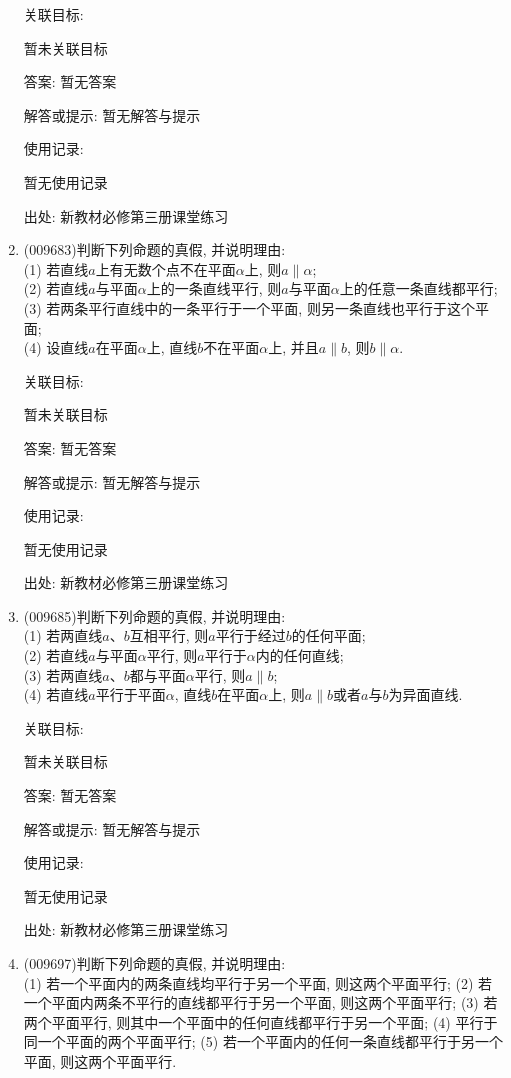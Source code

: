 \documentclass[10pt,a4paper]{article}
\begin{document}
\begin{enumerate}[1.]
关联目标:

暂未关联目标

答案: 暂无答案

解答或提示: 暂无解答与提示

使用记录:

暂无使用记录


出处: 新教材必修第三册课堂练习
\item { (009683)}判断下列命题的真假, 并说明理由:\\
(1) 若直线$a$上有无数个点不在平面$\alpha$上, 则$a\parallel \alpha$;\\
(2) 若直线$a$与平面$\alpha$上的一条直线平行, 则$a$与平面$\alpha$上的任意一条直线都平行;\\
(3) 若两条平行直线中的一条平行于一个平面, 则另一条直线也平行于这个平面;\\
(4) 设直线$a$在平面$\alpha$上, 直线$b$不在平面$\alpha$上, 并且$a\parallel b$, 则$b\parallel \alpha$.


关联目标:

暂未关联目标

答案: 暂无答案

解答或提示: 暂无解答与提示

使用记录:

暂无使用记录


出处: 新教材必修第三册课堂练习
\item { (009685)}判断下列命题的真假, 并说明理由:\\
(1) 若两直线$a$、$b$互相平行, 则$a$平行于经过$b$的任何平面;\\
(2) 若直线$a$与平面$\alpha$平行, 则$a$平行于$\alpha$内的任何直线;\\
(3) 若两直线$a$、$b$都与平面$\alpha$平行, 则$a\parallel b$;\\
(4) 若直线$a$平行于平面$\alpha$, 直线$b$在平面$\alpha$上, 则$a\parallel b$或者$a$与$b$为异面直线.


关联目标:

暂未关联目标

答案: 暂无答案

解答或提示: 暂无解答与提示

使用记录:

暂无使用记录


出处: 新教材必修第三册课堂练习
\item { (009697)}判断下列命题的真假, 并说明理由:\\
(1) 若一个平面内的两条直线均平行于另一个平面, 则这两个平面平行;
(2) 若一个平面内两条不平行的直线都平行于另一个平面, 则这两个平面平行;
(3) 若两个平面平行, 则其中一个平面中的任何直线都平行于另一个平面;
(4) 平行于同一个平面的两个平面平行;
(5) 若一个平面内的任何一条直线都平行于另一个平面, 则这两个平面平行.



\end{enumerate}
\end{document}
